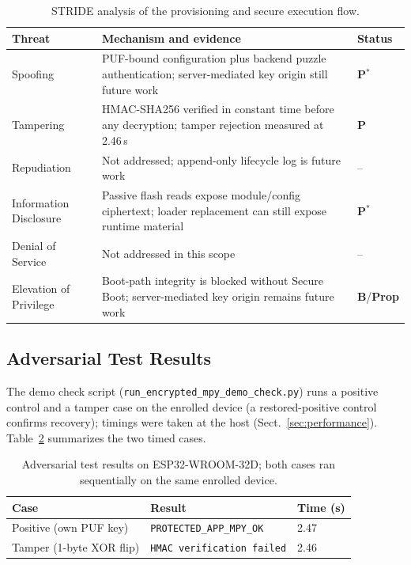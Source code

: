 \documentclass[runningheads]{llncs}
\begin{document}
\begin{table}[ht]
\caption{STRIDE analysis of the provisioning and secure execution flow.}
\label{tab:stride}
\centering
\setlength{\tabcolsep}{3pt}
\begin{tabularx}{\linewidth}{lXl}
\toprule
Threat & Mechanism and evidence & Status \\
\midrule
Spoofing
  & PUF-bound configuration plus backend puzzle authentication; server-mediated key origin still future work
  & \textbf{P}$^*$ \\
Tampering
  & HMAC-SHA256 verified in constant time before any decryption; tamper rejection measured at 2.46\,s
  & \textbf{P} \\
Repudiation
  & Not addressed; append-only lifecycle log is future work
  & -- \\
Information Disclosure
  & Passive flash reads expose module/config ciphertext; loader replacement can still expose runtime material
  & \textbf{P}$^*$ \\
Denial of Service
  & Not addressed in this scope
  & -- \\
Elevation of Privilege
  & Boot-path integrity is blocked without Secure Boot; server-mediated key origin remains future work
  & \textbf{B}/\textbf{Prop} \\
\bottomrule
\end{tabularx}
\end{table}

\subsection{Adversarial Test Results}

The demo check script (\texttt{run\_encrypted\_mpy\_demo\_check.py}) runs a
positive control and a tamper case on the enrolled device (a restored-positive
control confirms recovery); timings were taken at the host
(Sect.~\ref{sec:performance}). Table~\ref{tab:adversarial} summarizes the two timed cases.

\begin{table}[ht]
\caption{Adversarial test results on ESP32-WROOM-32D; both cases ran sequentially on the same enrolled device.}
\label{tab:adversarial}
\centering
\begin{tabular}{lll}
\toprule
Case & Result & Time (s) \\
\midrule
Positive (own PUF key)
  & \texttt{PROTECTED\_APP\_MPY\_OK}
  & 2.47 \\
Tamper (1-byte XOR flip)
  & \texttt{HMAC verification failed}
  & 2.46 \\
\bottomrule
\end{tabular}
\end{table}
\end{document}
